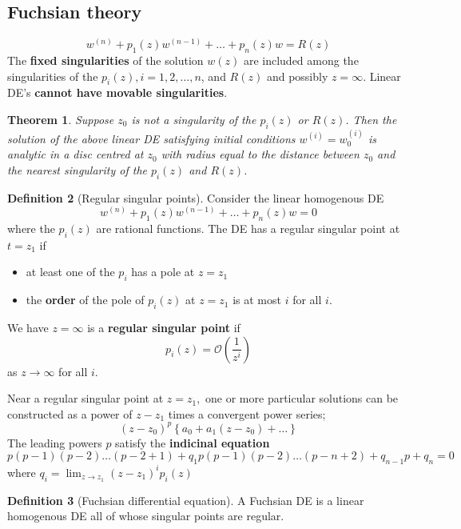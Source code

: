 \documentclass[10pt, oneside, reqno]{amsart}
\theoremstyle{plain}%
\newtheorem{thm}{Theorem}[section]
\theoremstyle{definition}
\newtheorem{defn}[thm]{Definition}
\theoremstyle{remark}
\newcommand{\bigo}[1]{\mathcal{O}(#1)}
\begin{document}





\subsection{Fuchsian theory} %
\label{sec:fuchsian_theory}
\[
	w^{(n)} + p_1(z) w^{(n-1)} + \dots + p_n(z) w = R(z)
\]
The \textbf{fixed singularities} of the solution $w(z)$ are included among the singularities of the $p_i(z), i = 1, 2, \dots, n$, and $R(z)$ and possibly $z = \infty$.  Linear DE's \textbf{cannot have movable singularities}.

\begin{thm}
	Suppose $z_0$ is not a singularity of the $p_i(z)$ or $R(z)$.  Then the solution of the above linear DE satisfying initial conditions $w^(i) = w^(i)_0$ is analytic in a disc centred at $z_0$ with radius equal to the distance between $z_0$ and the nearest singularity of the $p_i(z)$ and $R(z)$. 
\end{thm}

\begin{defn}[Regular singular points]
	Consider the linear homogenous DE \[
		w^{(n)} + p_1(z) w^{(n-1)} + \dots + p_n(z) w = 0
	\] where the $p_i(z)$ are rational functions.  The DE has a regular singular point at $t = z_1$ if 
	\begin{itemize}
		\item at least one of the $p_i$ has a pole at $z = z_1$
		\item the \textbf{order} of the pole of $p_i(z)$ at $z = z_1$ is at most $i$ for all $i$.
	\end{itemize}
	We have $z = \infty$ is a \textbf{regular singular point} if \[
		p_i(z) = \bigo{\frac{1}{z^i}}
	\]  as $z \rightarrow \infty$ for all $i$.
\end{defn}

Near a regular singular point at $z = z_1,$ one or more particular solutions can be constructed as a power of $z - z_1$ times a convergent power series;
\[
	(z - z_0)^p \left\{ a_0 + a_1 (z - z_0) + \dots \right\}
\]
The leading powers $p$ satisfy the \textbf{indicinal equation} \[
	p(p-1)(p-2)\dots(p-2+1) + q_1 p(p-1)(p-2)\dots(p-n+2) + q_{n-1}p + q_n = 0
\] where $q_i = \lim_{z \rightarrow z_1}(z - z_1)^i p_i (z)$

\begin{defn}[Fuchsian differential equation]
	A Fuchsian DE is a linear homogenous DE  all of whose singular points are regular. 
\end{defn}
\end{document}
